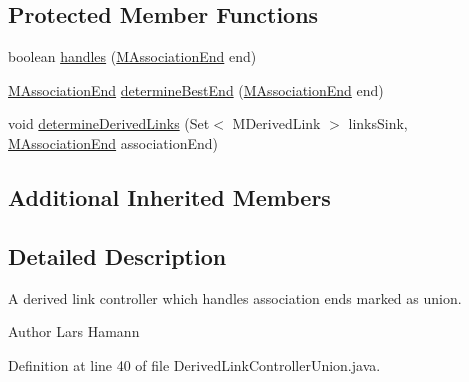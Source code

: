 \subsection*{Protected Member Functions}
\begin{DoxyCompactItemize}
\item 
boolean \hyperlink{classorg_1_1tzi_1_1use_1_1uml_1_1sys_1_1_derived_link_controller_union_aa9da056506227972630e85c3772544cf}{handles} (\hyperlink{classorg_1_1tzi_1_1use_1_1uml_1_1mm_1_1_m_association_end}{M\-Association\-End} end)
\item 
\hyperlink{classorg_1_1tzi_1_1use_1_1uml_1_1mm_1_1_m_association_end}{M\-Association\-End} \hyperlink{classorg_1_1tzi_1_1use_1_1uml_1_1sys_1_1_derived_link_controller_union_ad406b48879375b5b2f41ad818f3422ed}{determine\-Best\-End} (\hyperlink{classorg_1_1tzi_1_1use_1_1uml_1_1mm_1_1_m_association_end}{M\-Association\-End} end)
\item 
void \hyperlink{classorg_1_1tzi_1_1use_1_1uml_1_1sys_1_1_derived_link_controller_union_a2c1b9768e19a94501b3946b7b031ead5}{determine\-Derived\-Links} (Set$<$ M\-Derived\-Link $>$ links\-Sink, \hyperlink{classorg_1_1tzi_1_1use_1_1uml_1_1mm_1_1_m_association_end}{M\-Association\-End} association\-End)
\end{DoxyCompactItemize}
\subsection*{Additional Inherited Members}


\subsection{Detailed Description}
A derived link controller which handles association ends marked as union. \begin{DoxyAuthor}{Author}
Lars Hamann 
\end{DoxyAuthor}


Definition at line 40 of file Derived\-Link\-Controller\-Union.\-java.



